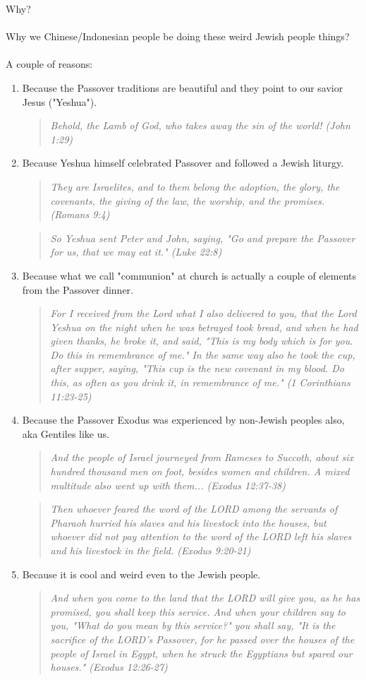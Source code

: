 \documentclass[10pt,oneside,footinclude=true,headinclude=true]{scrbook} %
\newcommand\quot[1]{
	\begin{quote}\textit{\small#1}\end{quote}
}
\begin{document}
Why?\\
\\
Why we Chinese/Indonesian people be doing these weird Jewish people things?\\
\\
A couple of reasons:
\begin{enumerate}
	\item{
		Because the Passover traditions are beautiful and they point to our savior Jesus ("Yeshua").
		\quot{Behold, the Lamb of God, who takes away the sin of the world! (John 1:29)}
	}
	\item{
		Because Yeshua himself celebrated Passover and followed a Jewish liturgy.
		\quot{They are Israelites, and to them belong the adoption, the glory, the covenants, the giving of the law, the worship, and the promises. (Romans 9:4)}
		\quot{So Yeshua sent Peter and John, saying, "Go and prepare the Passover for us, that we may eat it." (Luke 22:8)}
	}
	\item{
		Because what we call "communion" at church is actually a couple of elements from the Passover dinner.
		\quot{For I received from the Lord what I also delivered to you, that the Lord Yeshua on the night when he was betrayed took bread, and when he had given thanks, he broke it, and said, "This is my body which is for you. Do this in remembrance of me." In the same way also he took the cup, after supper, saying, "This cup is the new covenant in my blood. Do this, as often as you drink it, in remembrance of me." (1 Corinthians 11:23-25)}
	}
	\item{
		Because the Passover Exodus was experienced by non-Jewish peoples also, aka Gentiles like us.
		\quot{And the people of Israel journeyed from Rameses to Succoth, about six hundred thousand men on foot, besides women and children. A mixed multitude also went up with them... (Exodus 12:37-38)}
	}
		\quot{Then whoever feared the word of the LORD among the servants of Pharaoh hurried his slaves and his livestock into the houses, but whoever did not pay attention to the word of the LORD left his slaves and his livestock in the field. (Exodus 9:20-21)}
	\item{
		Because it is cool and weird even to the Jewish people.
		\quot{And when you come to the land that the LORD will give you, as he has promised, you shall keep this service. And when your children say to you, "What do you mean by this service?" you shall say, "It is the sacrifice of the LORD's Passover, for he passed over the houses of the people of Israel in Egypt, when he struck the Egyptians but spared our houses." (Exodus 12:26-27)}
}
\end{enumerate}
\end{document}
